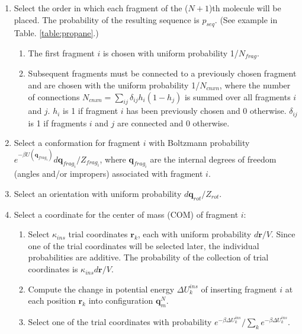 

\begin{enumerate}
  \item Select the order in which each fragment of the ($N+1$)th molecule will be placed. The probability of the resulting sequence is $p_{seq}$. (See example in Table. \ref{table:propane}.)
  \begin{enumerate}
		\item The first fragment $i$ is chosen with uniform probability 1/$N_{frag}$.
    \item Subsequent fragments must be connected to a previously chosen fragment and are chosen with the uniform probability 1/$N_{cnxn}$, where the number of connections $N_{cnxn}= \sum_{ij}{\delta_{ij} h_{i} (1-h_{j})}$ is summed over all fragments $i$ and $j$. $h_i$ is 1 if fragment $i$ has been previously chosen and 0 otherwise. $\delta_{ij}$ is 1 if fragments $i$ and $j$ are connected and 0 otherwise.
  \end{enumerate}
	\item Select a conformation for fragment $i$ with Boltzmann probability \newline $e^{-\beta U(\mathbf{q}_{frag_i})}d\mathbf{q}_{frag_i}/Z_{frag_i}$, where $\mathbf{q}_{frag_i}$ are the internal degrees of freedom (angles and/or impropers) associated with fragment $i$.
	\item Select an orientation with uniform probability $d\mathbf{q}_{rot}/Z_{rot}$. 
	\item Select a coordinate for the center of mass (COM) of fragment $i$:
	\begin{enumerate}
		\item Select $\kappa_{ins}$ trial coordinates $\mathbf{r}_k$, each with uniform probability $d\mathbf{r}/V$. Since one of the trial coordinates will be selected later, the individual probabilities are additive. The probability of the collection of trial coordinates is $\kappa_{ins}d\mathbf{r}/V$.
		\item Compute the change in potential energy $\Delta U_k^{ins}$ of inserting fragment $i$ at each position $\mathbf{r}_k$ into configuration $\mathbf{q}_m^N$.
		\item Select one of the trial coordinates with probability $e^{-\beta \Delta U_k^{ins}} / \sum_k{e^{-\beta \Delta U_k^{ins}}}$.

\end{enumerate}
\end{enumerate}
